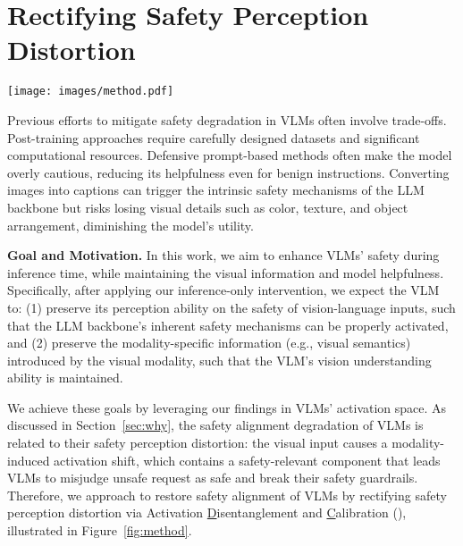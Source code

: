 \section{Rectifying Safety Perception Distortion}





\begin{figure*}[t] 
\begin{center}
    \texttt{[image: images/method.pdf]}
\end{center}
\vspace{-25pt}
\caption{Overview of the proposed Activation Shift Disentanglement and Calibration (\OursMethod). }
\label{fig:method}
\vspace{-15pt}
\end{figure*}


Previous efforts to mitigate safety degradation in VLMs often involve trade-offs. Post-training approaches \cite{zong2024safety} require carefully designed datasets and significant computational resources. Defensive prompt-based methods \cite{wang2024adashield} often make the model overly cautious, reducing its helpfulness even for benign instructions. Converting images into captions \cite{gou2025eyes} can trigger the intrinsic safety mechanisms of the LLM backbone but risks losing visual details such as color, texture, and object arrangement, diminishing the model's utility.

\textbf{Goal and Motivation.}
In this work, we aim to enhance VLMs' safety during inference time, while maintaining the visual information and model helpfulness. Specifically, after applying our inference-only intervention, we expect the VLM to: (1) preserve its perception ability on the safety of vision-language inputs, such that the LLM backbone's inherent safety mechanisms can be properly activated, and (2) preserve the modality-specific information (e.g., visual semantics) introduced by the visual modality, such that the VLM's vision understanding ability is maintained. 

We achieve these goals by leveraging our findings in VLMs' activation space.
As discussed in Section~\ref{sec:why}, the safety alignment degradation of VLMs is related to their safety perception distortion: the visual input causes a modality-induced activation shift, which contains a safety-relevant component that leads VLMs to misjudge unsafe request as safe and break their safety guardrails. Therefore, we approach to restore safety alignment of VLMs by rectifying safety perception distortion via Activation \underline{} \underline{D}isentanglement and \underline{C}alibration (\textbf{\OursMethod}), illustrated in Figure~\ref{fig:method}.


